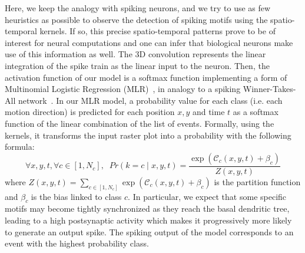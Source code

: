 \documentclass[default]{sn-jnl}%
\theoremstyle{thmstyleone}%
\theoremstyle{thmstyletwo}%
\theoremstyle{thmstylethree}%
\newcommand{\postsynaddr}{b} %
\newcommand{\bias}{\beta} %
\newcommand{\synapse}{\mathcal{S}} %
\newcommand{\timev}{t} %
\newcommand{\class}{c} %
\newcommand{\note}[1]{{\sethlcolor{yellow}\hl{#1}}}
\begin{document}
Here, we keep the analogy with spiking neurons, and we try to use as few heuristics as possible to observe the detection of spiking motifs using the spatio-temporal kernels. If so, this precise spatio-temporal patterns prove to be of interest for neural computations and one can infer that biological neurons make use of this information as well. 
The 3D convolution represents the linear integration of the spike train as the linear input to the neuron. Then, the activation function of our model is a softmax function implementing a form of Multinomial Logistic Regression (MLR)~\citep{grimaldi_robust_2022}, in analogy to a spiking Winner-Takes-All network~\citep{nessler_bayesian_2013}. In our MLR model, a probability value for each class (i.e. each motion direction) is predicted for each position $x, y$ and time $\timev$ as a softmax function of the linear combination of the list of events. %
Formally, using the kernels, it transforms the input raster plot into a probability with the following formula:
%
\begin{equation}\label{eq:mlr}
    \forall x, y, \timev, \forall \class \in [1, N_\class], \; \;
Pr(k=\class \; \vert \;  x, y, \timev) =
\frac {\exp  (\mathcal{C}_\class(x, y, \timev) +\bias_\class) }{Z(x, y, \timev)}
\end{equation} 
%
where $Z(x, y, \timev)=\sum_{\class \in [1, N_\class]} \exp  (\mathcal{C}_\class(x, y, \timev) +\bias_\class)$ is the partition function and  $\bias_\class$ is the bias linked to class $\class$. 
In particular, we expect that some specific motifs may become tightly synchronized as they reach the basal dendritic tree, leading to a high postsynaptic activity which makes it progressively more likely to generate an output spike. The spiking output of the model corresponds to an event with the highest probability class. 
\end{document}
